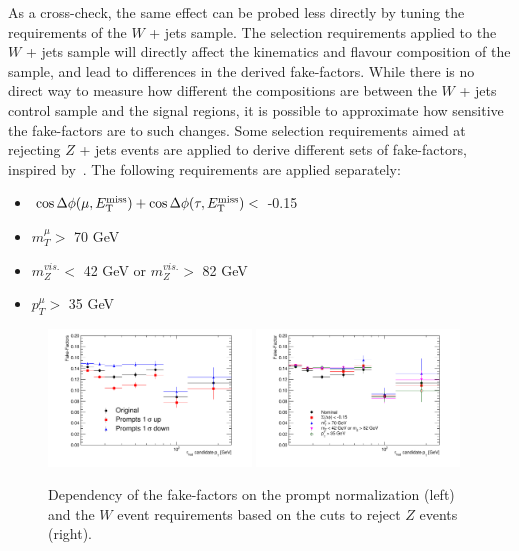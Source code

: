 As a cross-check, the same effect can be probed less directly by tuning the requirements
of the $W$ + jets sample. The selection requirements applied to the $W$ + jets sample will
directly affect the kinematics and flavour composition of the sample, and lead to
differences in the derived fake-factors. While there is no direct way to measure how
different the compositions are between the $W$ + jets control sample and the signal
regions, it is possible to approximate how sensitive the fake-factors are to such changes.
Some selection requirements aimed at rejecting $Z$ + jets events are applied to derive
different sets of fake-factors, inspired by~\cite{zttnote,tauidnote}.  The following
requirements are applied separately:

\begin{itemize}
\item $\cos{\Delta\phi(\mu, \ensuremath{E_{\text{T}}^{\text{miss}}})} + \cos{\Delta\phi(\tau, \ensuremath{E_{\text{T}}^{\text{miss}}})} <$ -0.15
\item $m_{T}^{\mu} >$ 70 GeV
\item $m_{Z}^{vis.} <$ 42 GeV or $m_{Z}^{vis.} >$ 82 GeV
\item $p_{T}^{\mu} >$ 35 GeV
\end{itemize}

\begin{figure}
\centering \includegraphics[width=0.48\textwidth]{figures/ch5-model-independent/TauFakes_PromptsDep}
\centering \includegraphics[width=0.48\textwidth]{figures/ch5-model-independent/TauFakes_CutsDep}
\caption{\label{fig:fakesys} Dependency of the fake-factors on the prompt normalization
  (left) and the $W$ event requirements based on the cuts to reject $Z$ events (right).}
\end{figure}


